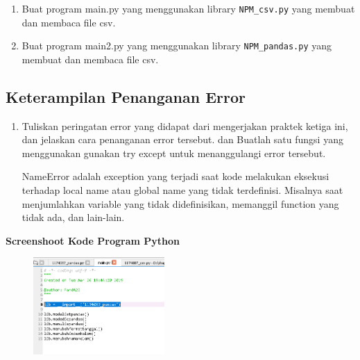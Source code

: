 \begin{enumerate}
	
	
	\item Buat program main.py yang menggunakan library \verb|NPM_csv.py| yang membuat dan membaca file csv.
	
	
	
	\item Buat program main2.py yang menggunakan library \verb|NPM_pandas.py| yang membuat dan membaca file csv.

	
\end{enumerate} 

\subsection{Keterampilan Penanganan Error}

\begin{enumerate}
	\item Tuliskan peringatan error yang didapat dari mengerjakan praktek ketiga ini,
dan jelaskan cara penanganan error tersebut. dan Buatlah satu fungsi yang
menggunakan gunakan try except untuk menanggulangi error tersebut.

	
	
	\par NameError adalah exception yang terjadi saat kode melakukan eksekusi terhadap local name atau global name yang tidak terdefinisi. Misalnya saat menjumlahkan variable yang tidak didefinisikan, memanggil function yang tidak ada, dan lain-lain.
	
\end{enumerate}

\textbf{Screenshoot Kode Program Python}

\begin{figure}[H]
 \includegraphics[width=5cm]{figures/4/1174087/Praktek/main.png}
 \centering
\end{figure}

